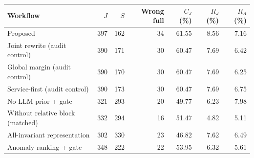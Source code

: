 \begin{tabular*}{\linewidth}{@{\extracolsep{\fill}}lrrrrrr@{}}
\toprule
Workflow & $J$ & $S$ & Wrong full & $C_J$ (\%) & $R_J$ (\%) & $R_A$ (\%) \\
\midrule
Proposed & 397 & 162 & 34 & 61.55 & 8.56 & 7.16 \\
Joint rewrite (audit control) & 390 & 171 & 30 & 60.47 & 7.69 & 6.42 \\
Global margin (audit control) & 390 & 170 & 30 & 60.47 & 7.69 & 6.25 \\
Service-first (audit control) & 390 & 173 & 30 & 60.47 & 7.69 & 6.75 \\
No LLM prior + gate & 321 & 293 & 20 & 49.77 & 6.23 & 7.98 \\
Without relative block (matched) & 332 & 294 & 16 & 51.47 & 4.82 & 5.11 \\
All-invariant representation & 302 & 330 & 23 & 46.82 & 7.62 & 6.49 \\
Anomaly ranking + gate & 348 & 222 & 22 & 53.95 & 6.32 & 5.61 \\
\bottomrule
\end{tabular*}
